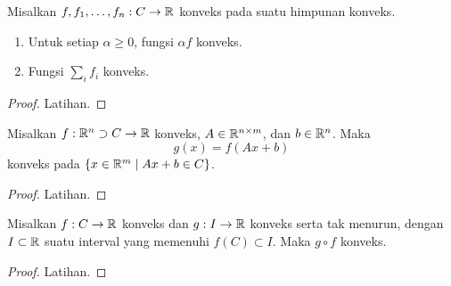 
\begin{lemma}
    Misalkan $f,f_1,\dots,f_n:C\rightarrow\mathbb{R}$ konveks pada suatu himpunan konveks.
    \begin{enumerate}
        \item Untuk setiap $\alpha\geq0$, fungsi $\alpha f$ konveks.
        \item Fungsi $\sum_i f_i$ konveks.
    \end{enumerate}
\end{lemma}
\begin{proof}
    Latihan.
\end{proof}

\begin{lemma}
    Misalkan $f:\mathbb{R}^n\supset C\rightarrow\mathbb{R}$ konveks, $A\in\mathbb{R}^{n\times m}$, dan $b\in\mathbb{R}^n$. Maka
    \begin{equation}
        g(x)=f(Ax+b)
    \end{equation}
    konveks pada $\{x\in\mathbb{R}^m\;|\;Ax+b\in C\}$.
\end{lemma}
\begin{proof}
    Latihan.
\end{proof}

\begin{lemma}
    Misalkan $f:C\rightarrow\mathbb{R}$ konveks dan $g:I\rightarrow\mathbb{R}$ konveks serta tak menurun, dengan $I\subset\mathbb{R}$ suatu interval yang memenuhi $f(C)\subset I$. Maka $g\circ f$ konveks.
\end{lemma}
\begin{proof}
    Latihan.
\end{proof}

